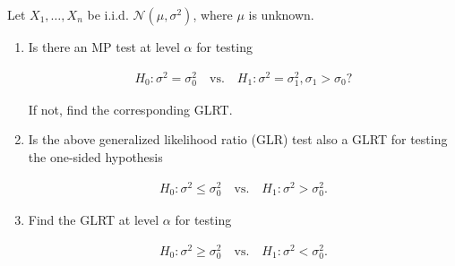 
\begin{exercise}

    Let $X_1,\dots,X_n$ be i.i.d. $\mathcal{N}(\mu,\sigma^2)$, where $\mu$ is unknown.
    
    
    \begin{enumerate}[label = (\alph*)]
      \item Is there an MP test at level $\alpha$ for testing
      
      \begin{align*}
          H_0: \sigma^2 = \sigma_0^2 \quad \text{vs.} \quad H_1: \sigma^2 = \sigma_1^2, \sigma_1 > \sigma_0?
      \end{align*}

      If not, find the corresponding GLRT.

      \item Is the above generalized likelihood ratio (GLR) test also a GLRT for testing the
      one-sided hypothesis

      \begin{align*}
          H_0: \sigma^2 \leq \sigma_0^2 \quad \text{vs.} \quad H_1: \sigma^2 > \sigma_0^2.
      \end{align*}

      \item Find the GLRT at level $\alpha$ for testing
      
      \begin{align*}
          H_0: \sigma^2 \geq \sigma_0^2 \quad \text{vs.} \quad H_1: \sigma^2 < \sigma_0^2.
      \end{align*}
    \end{enumerate}
    
    \end{exercise}
    
    
